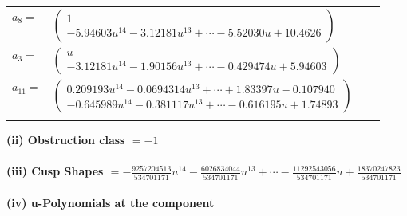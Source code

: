\documentclass[1p]{elsarticle_modified}
\theoremstyle{definition}
\begin{document}
\begin{tabular}{m{7pt} m{180pt} m{7pt} m{180pt} }
\flushright $a_{8}=$&$\begin{pmatrix}1\\-5.94603 u^{14}-3.12181 u^{13}+\cdots-5.52030 u+10.4626\end{pmatrix}$ \\
\flushright $a_{3}=$&$\begin{pmatrix}u\\-3.12181 u^{14}-1.90156 u^{13}+\cdots-0.429474 u+5.94603\end{pmatrix}$ \\
\flushright $a_{11}=$&$\begin{pmatrix}0.209193 u^{14}-0.0694314 u^{13}+\cdots+1.83397 u-0.107940\\-0.645989 u^{14}-0.381117 u^{13}+\cdots-0.616195 u+1.74893\end{pmatrix}$\\&\end{tabular}
\flushleft \textbf{(ii) Obstruction class $= -1$}\\~\\
\flushleft \textbf{(iii) Cusp Shapes $= -\frac{9257204513}{534701171} u^{14}-\frac{6026834044}{534701171} u^{13}+\cdots-\frac{11292543056}{534701171} u+\frac{18370247823}{534701171}$}\\~\\
\newpage\renewcommand{\arraystretch}{1}
\flushleft \textbf{(iv) u-Polynomials at the component}\newline \\
\end{document}
